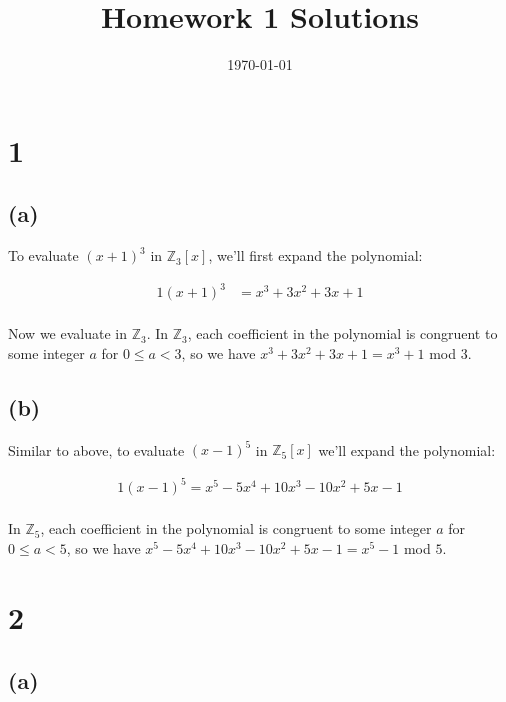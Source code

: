 \documentclass{article}
\title{\textbf{Homework 1 Solutions}}
\date{}
\date\today
\begin{document}
\maketitle %

\thispagestyle{firstpage}
\section*{1}

\subsection*{(a)}
 
To evaluate $(x+1)^3$ in $\mathbb{Z}_3 [x]$, we'll first expand the polynomial:

\begin{alignat*}{1}
    (x+1)^3 &= x^3 + 3x^2 + 3x + 1 \\ 
\end{alignat*}

Now we evaluate in $\mathbb{Z}_3$.  In $\mathbb{Z}_3$, each coefficient in the 
polynomial is congruent to some integer $a$ for $0 \leq a < 3$, so we have 
$x^3 + 3x^2 + 3x + 1 = x^3 + 1$ mod $3$.


\subsection*{(b)}

Similar to above, to evaluate $(x-1)^5$ in $\mathbb{Z}_5 [x]$ we'll expand the 
polynomial: 

\begin{alignat*}{1}
    (x-1)^5 = x^5 - 5x^4 + 10x^3 - 10x^2 + 5x -1 \\ 
\end{alignat*}

In $\mathbb{Z}_5$, each coefficient in the polynomial is congruent to some integer 
$a$ for $0 \leq a < 5$, so we have $x^5 - 5x^4 + 10x^3 - 10x^2 + 5x -1 = x^5 - 1$ mod $5$.

\section*{2}

\subsection*{(a)} 
\end{document}
